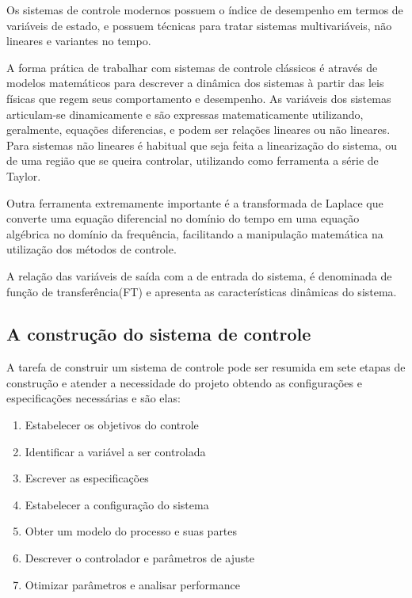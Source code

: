 Os sistemas de controle modernos possuem o índice de desempenho em termos de variáveis de estado, e possuem técnicas para tratar sistemas multivariáveis, não lineares e variantes no tempo.

A forma prática de trabalhar com sistemas de controle clássicos é através de modelos matemáticos para descrever a dinâmica dos sistemas à partir das leis físicas que regem seus comportamento e desempenho.
As variáveis dos sistemas articulam-se dinamicamente e são expressas matematicamente utilizando, geralmente, equações diferencias, e podem ser relações lineares ou não lineares. Para sistemas não lineares é habitual que seja feita a linearização do sistema, ou de uma região que se queira controlar, utilizando como ferramenta a série de Taylor. 

Outra ferramenta extremamente importante é a transformada de Laplace que converte uma equação diferencial no domínio do tempo em uma equação algébrica no domínio da frequência, facilitando a manipulação matemática na utilização dos métodos de controle. 

A relação das variáveis de saída com a de entrada do sistema, é denominada de função de transferência(FT) e apresenta as características dinâmicas do sistema.




\subsection{A construção do sistema de controle}
A tarefa de construir um sistema de controle pode ser resumida em sete etapas de construção e atender a necessidade do projeto obtendo as configurações e especificações necessárias e são elas:

\begin{enumerate}
	\item Estabelecer os objetivos do controle
	\item Identificar a variável a ser controlada
	\item Escrever as especificações
	\item Estabelecer a configuração do sistema
	\item Obter um modelo do processo e suas partes
	\item Descrever o controlador e parâmetros de ajuste
	\item Otimizar parâmetros e analisar performance



\end{enumerate}


